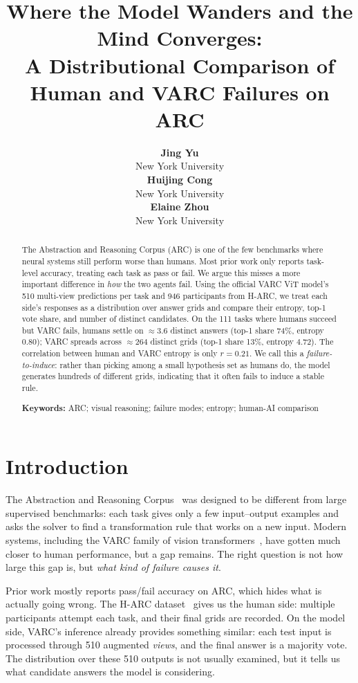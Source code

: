 \documentclass[10pt,letterpaper]{article}
\title{Where the Model Wanders and the Mind Converges: \\
A Distributional Comparison of Human and VARC Failures on ARC}
\author{{\large \bf Jing Yu} \\
  New York University \\
  \And
  {\large \bf Huijing Cong} \\
  New York University \\
  \And
  {\large \bf Elaine Zhou} \\
  New York University}
\date{}
\begin{document}
\maketitle

\begin{abstract}
The Abstraction and Reasoning Corpus (ARC) is one of the few benchmarks
where neural systems still perform worse than humans. Most prior work
only reports task-level accuracy, treating each task as pass or fail.
We argue this misses a more important difference in \emph{how} the two
agents fail. Using the official VARC ViT model's 510 multi-view
predictions per task and 946 participants from H-ARC, we treat each
side's responses as a distribution over answer grids and compare their
entropy, top-1 vote share, and number of distinct candidates. On the
111 tasks where humans succeed but VARC fails, humans settle on
$\approx 3.6$ distinct answers (top-1 share 74\%, entropy $0.80$);
VARC spreads across $\approx 264$ distinct grids (top-1 share 13\%,
entropy $4.72$). The correlation between human and VARC entropy is only
$r = 0.21$. We call this a \emph{failure-to-induce}: rather than picking
among a small hypothesis set as humans do, the model generates hundreds
of different grids, indicating that it often fails to induce a stable rule.

\textbf{Keywords:} ARC; visual reasoning; failure modes; entropy;
human-AI comparison
\end{abstract}

\section{Introduction}

The Abstraction and Reasoning Corpus~\cite{chollet2019measure} was
designed to be different from large supervised benchmarks: each task
gives only a few input--output examples and asks the solver to find a
transformation rule that works on a new input. Modern systems, including
the VARC family of vision transformers~\cite{varc}, have gotten much
closer to human performance, but a gap remains. The right question is
not how large this gap is, but \emph{what kind of failure causes it}.

Prior work mostly reports pass/fail accuracy on ARC, which hides what
is actually going wrong. The H-ARC dataset~\cite{harc} gives us the
human side: multiple participants attempt each task, and their final
grids are recorded. On the model side, VARC's inference already
provides something similar: each test input is processed through 510
augmented \emph{views}, and the final answer is a majority vote. The
distribution over these 510 outputs is not usually examined, but it
tells us what candidate answers the model is considering.
\end{document}
